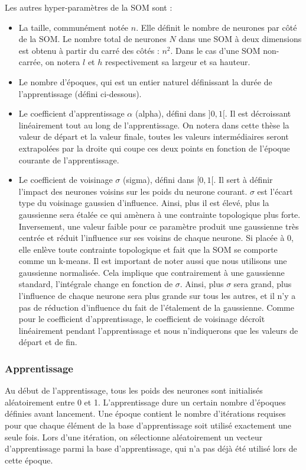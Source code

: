 	Les autres hyper-paramètres de la SOM sont : 
	\begin{itemize}
	\item La taille, communément notée $n$. Elle définit le nombre de neurones par côté de la SOM. Le nombre total de neurones $N$ dans une SOM à deux dimensions est obtenu à partir du carré des côtés : $n^2$. Dans le cas d'une SOM non-carrée, on notera $l$ et $h$ respectivement sa largeur et sa hauteur.
	\item Le nombre d'époques, qui est un entier naturel définissant la durée de l'apprentissage (défini ci-dessous). 
	\item Le coefficient d'apprentissage $\alpha$ (alpha), défini dans $]0,1[$. Il est décroissant linéairement tout au long de l'apprentissage. On notera dans cette thèse la valeur de départ et la valeur finale, toutes les valeurs intermédiaires seront extrapolées par la droite qui coupe ces deux points en fonction de l'époque courante de l'apprentissage. 
	\item Le coefficient de voisinage $\sigma$ (sigma), défini dans $[0,1[$. Il sert à définir l'impact des neurones voisins sur les poids du neurone courant. $\sigma$ est l'écart type du voisinage gaussien d'influence. Ainsi, plus il est élevé, plus la gaussienne sera étalée ce qui amènera à une contrainte topologique plus forte. Inversement, une valeur faible pour ce paramètre produit une gaussienne très centrée et réduit l'influence sur ses voisins de chaque neurone. Si placée à 0, elle enlève toute contrainte topologique et fait que la SOM se comporte comme un k-means. Il est important de noter aussi que nous utilisons une gaussienne normalisée. Cela implique que contrairement à une gaussienne standard, l'intégrale change en fonction de $\sigma$. Ainsi, plus $\sigma$ sera grand, plus l'influence de chaque neurone sera plus grande sur tous les autres, et il n'y a pas de réduction d'influence du fait de l'étalement de la gaussienne. Comme pour le coefficient d'apprentissage, le coefficient de voisinage décroît linéairement pendant l'apprentissage et nous n'indiquerons que les valeurs de départ et de fin. 
	\end{itemize}
	

\subsubsection{Apprentissage}

	Au début de l'apprentissage, tous les poids des neurones sont initialisés aléatoirement entre 0 et 1. L'apprentissage dure un certain nombre d'époques définies avant lancement. Une époque contient le nombre d'itérations requises pour que chaque élément de la base d'apprentissage soit utilisé exactement une seule fois. Lors d'une itération, on sélectionne aléatoirement un vecteur d'apprentissage parmi la base d'apprentissage, qui n'a pas déjà été utilisé lors de cette époque. 

